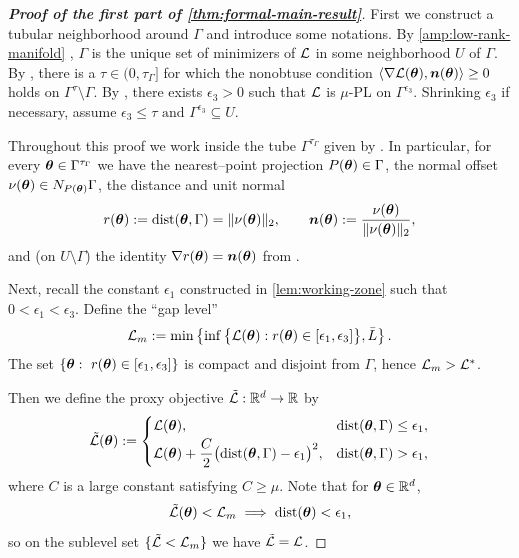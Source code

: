 \begin{proof}[\textbf{Proof of the first part of \cref{thm:formal-main-result}}] First we construct a tubular neighborhood around $\Gamma$ and introduce some notations.
By \cref{amp:low-rank-manifold} , $\Gamma$ is the unique set of minimizers of $\mathcal{L}$ in some  neighborhood $U$ of $\Gamma$. 
By , there is a $\tau\in(0,\tau_\Gamma]$ for which the
nonobtuse condition $\langle \nabla\mathcal{L}({\bm{\theta}}),{\bm{n}}({\bm{\theta}})\rangle\ge 0$ holds on
$\Gamma^\tau\setminus\Gamma$. By , there exists
$\epsilon_3>0$ such that $\mathcal{L}$ is $\mu$-PL on $\Gamma^{\epsilon_3}$. Shrinking $\epsilon_3$ if necessary, assume $\epsilon_3 \leq \tau \text{ and } \Gamma^{\epsilon_3} \subseteq U$.

Throughout this proof we work inside the tube $\Gamma^{\tau_\Gamma}$ given by
. In particular, for every ${\bm{\theta}}\in \Gamma^{\tau_\Gamma}$ we have the nearest–point
projection $P({\bm{\theta}})\in\Gamma$, the normal offset $\nu({\bm{\theta}})\in N_{P({\bm{\theta}})}\Gamma$,
the distance and unit normal
\begin{align*}
  r({\bm{\theta}}):=\mathrm{dist}({\bm{\theta}},\Gamma)=\|\nu({\bm{\theta}})\|_2,\qquad
  {\bm{n}}({\bm{\theta}}):=\frac{\nu({\bm{\theta}})}{\|\nu({\bm{\theta}})\|_2},
\end{align*}
and (on $U\setminus\Gamma$) the identity $\nabla r({\bm{\theta}})={\bm{n}}({\bm{\theta}})$ from
.

Next, recall the constant $\epsilon_1$ constructed in \cref{lem:working-zone} such that $0<\epsilon_1<\epsilon_3$. 
Define the “gap level”
\begin{align*}
  \mathcal{L}_m := \min\left\{\inf\big\{ \mathcal{L}({\bm{\theta}}):r({\bm{\theta}})\in[\epsilon_1,\epsilon_3] \big\}, \bar{L} \right\}.
\end{align*}
The set $\{\vtheta:\ r(\vtheta)\in[\epsilon_1,\epsilon_3]\}$ is compact and
disjoint from $\Gamma$, hence $\mathcal{L}_m>\mathcal{L}^*$.

Then we define the proxy objective $\tilde{\mathcal{L}}:\mathbb{R}^d\to\mathbb{R}$ by
\begin{align*}
  \tilde{\mathcal{L}}({\bm{\theta}})
  :=\begin{cases}
      \mathcal{L}({\bm{\theta}}), & \mathrm{dist}({\bm{\theta}},\Gamma)\le \epsilon_1,\\[2pt]
      \mathcal{L}({\bm{\theta}})+\dfrac{C}{2}\big(\mathrm{dist}({\bm{\theta}},\Gamma)-\epsilon_1\big)^2, & \mathrm{dist}({\bm{\theta}},\Gamma)>\epsilon_1,
    \end{cases}
\end{align*}
where $C$ is a large constant satisfying $C \geq \mu$. Note that for ${\bm{\theta}} \in \mathbb{R}^d$,
\[
  \tilde{\mathcal{L}}({\bm{\theta}}) < \mathcal{L}_m \;\Longrightarrow\; \mathrm{dist}({\bm{\theta}})<\epsilon_1,
\]
so on the sublevel set $\{\tilde{\mathcal{L}}<\mathcal{L}_m\}$ we have $\tilde{\mathcal{L}}=\mathcal{L}$.


\end{proof}
